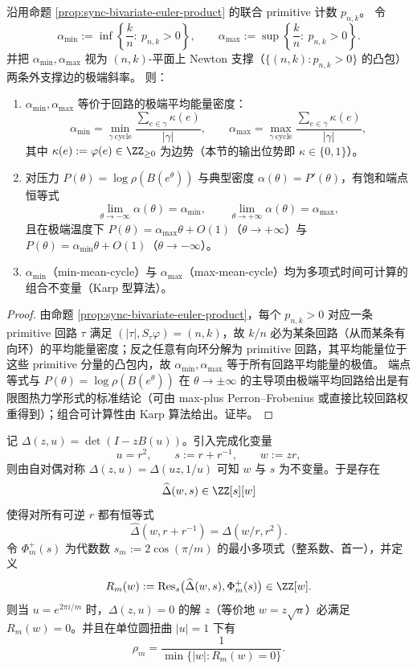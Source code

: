 \begin{proposition}\label{prop:sync-newton-extreme-slopes}
沿用命题 \ref{prop:sync-bivariate-euler-product} 的联合 primitive 计数 \(p_{n,k}\)。
令
\[
\alpha_{\min}:=\inf\left\{\frac{k}{n}:\ p_{n,k}>0\right\},\qquad
\alpha_{\max}:=\sup\left\{\frac{k}{n}:\ p_{n,k}>0\right\}.
\]
并把 \(\alpha_{\min},\alpha_{\max}\) 视为 \((n,k)\)-平面上 Newton 支撑（\(\{(n,k):p_{n,k}>0\}\) 的凸包）两条外支撑边的极端斜率。
则：
\begin{enumerate}
  \item \(\alpha_{\min},\alpha_{\max}\) 等价于回路的极端平均能量密度：
  \[
  \alpha_{\min}=\min_{\gamma\ \mathrm{cycle}}\frac{\sum_{e\in\gamma}\kappa(e)}{|\gamma|},
  \qquad
  \alpha_{\max}=\max_{\gamma\ \mathrm{cycle}}\frac{\sum_{e\in\gamma}\kappa(e)}{|\gamma|},
  \]
  其中 \(\kappa(e):=\varphi(e)\in\ZZ_{\ge 0}\) 为边势（本节的输出位势即 \(\kappa\in\{0,1\}\)）。
  \item 对压力 \(P(\theta)=\log\rho(B(e^{\theta}))\) 与典型密度 \(\alpha(\theta)=P'(\theta)\)，有饱和端点恒等式
  \[
  \lim_{\theta\to-\infty}\alpha(\theta)=\alpha_{\min},\qquad
  \lim_{\theta\to+\infty}\alpha(\theta)=\alpha_{\max},
  \]
  且在极端温度下 \(P(\theta)=\alpha_{\max}\theta+O(1)\)（\(\theta\to+\infty\)）与 \(P(\theta)=\alpha_{\min}\theta+O(1)\)（\(\theta\to-\infty\)）。
  \item \(\alpha_{\min}\)（min-mean-cycle）与 \(\alpha_{\max}\)（max-mean-cycle）均为多项式时间可计算的组合不变量（Karp 型算法）。
\end{enumerate}
\end{proposition}
\begin{proof}
由命题 \ref{prop:sync-bivariate-euler-product}，每个 \(p_{n,k}>0\) 对应一条 primitive 回路 \(\tau\) 满足 \((|\tau|,S_\tau\varphi)=(n,k)\)，故 \(k/n\) 必为某条回路（从而某条有向环）的平均能量密度；反之任意有向环分解为 primitive 回路，其平均能量位于这些 primitive 分量的凸包内，故 \(\alpha_{\min},\alpha_{\max}\) 等于所有回路平均能量的极值。
端点等式与 \(P(\theta)=\log\rho(B(e^\theta))\) 在 \(\theta\to\pm\infty\) 的主导项由极端平均回路给出是有限图热力学形式的标准结论（可由 max-plus Perron--Frobenius 或直接比较回路权重得到）；组合可计算性由 Karp 算法给出。证毕。
\end{proof}

\begin{proposition}\label{prop:sync-cyclotomic-elimination}
记 $\Delta(z,u)=\det(I-zB(u))$。引入完成化变量
\[
u=r^2,\qquad s:=r+r^{-1},\qquad w:=zr,
\]
则由自对偶对称 $\Delta(z,u)=\Delta(uz,1/u)$ 可知 $w$ 与 $s$ 为不变量。于是存在
\[
\widehat{\Delta}(w,s)\in\ZZ[s][w]
\]
使得对所有可逆 $r$ 都有恒等式
\[
\widehat{\Delta}(w,r+r^{-1})=\Delta(w/r,r^2).
\]
令 $\Phi_m^+(s)$ 为代数数 $s_m:=2\cos(\pi/m)$ 的最小多项式（整系数、首一），并定义
\[
R_m(w):=\operatorname{Res}_s\bigl(\widehat{\Delta}(w,s),\Phi_m^+(s)\bigr)\in\ZZ[w].
\]
则当 $u=e^{2\pi i/m}$ 时，$\Delta(z,u)=0$ 的解 $z$（等价地 $w=z\sqrt{u}$）必满足 $R_m(w)=0$。并且在单位圆扭曲 $|u|=1$ 下有
\[
\rho_m=\frac{1}{\min\{|w|:R_m(w)=0\}}.
\]
\end{proposition}

